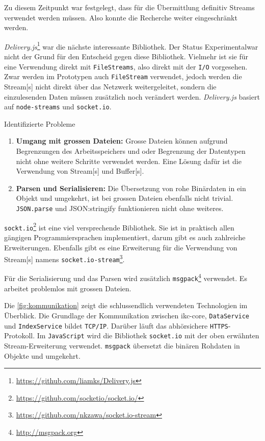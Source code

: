 Zu diesem Zeitpunkt war festgelegt, dass für die Übermittlung definitiv Streams verwendet werden müssen. Also konnte die Recherche weiter eingeschränkt werden.

\textit{Delivery.js}\footnote{\url{https://github.com/liamks/Delivery.js}} war die nächste interessante Bibliothek. Der Status \glqq Experimental\grqq war nicht der Grund für den Entscheid gegen diese Bibliothek. Vielmehr ist sie für eine Verwendung direkt mit \texttt{FileStreams}, also direkt mit der \texttt{I/O} vorgesehen. Zwar werden im Prototypen auch \texttt{FileStream} verwendet, jedoch werden die \gls{Stream}[s] nicht direkt über das Netzwerk weitergeleitet, sondern die einzulesenden Daten müssen zusätzlich noch verändert werden. \textit{Delivery.js} basiert auf \texttt{node-streams} und \texttt{socket.io}.

Identifizierte Probleme
\begin{enumerate}
    \item \textbf{Umgang mit grossen Dateien:} Grosse Dateien können aufgrund Begrenzungen des Arbeitsspeichers und oder Begrenzung der Datentypen nicht ohne weitere Schritte verwendet werden. Eine Lösung dafür ist die Verwendung von \gls{Stream}[s] und \gls{Buffer}[s].
    \item \textbf{Parsen und Serialisieren:} Die Übersetzung von rohe Binärdaten in ein Objekt und umgekehrt, ist bei grossen Dateien ebenfalls nicht trivial. \texttt{JSON.parse} und {JSON:stringify} funktionieren nicht ohne weiteres.
\end{enumerate}

\texttt{sockt.io}\footnote{\url{https://github.com/socketio/socket.io/}} ist eine viel versprechende Bibliothek. Sie ist in praktisch allen gängigen Programmiersprachen implementiert, darum gibt es auch zahlreiche Erweiterungen. Ebenfalls gibt es eine Erweiterung für die Verwendung von \gls{Stream}[s] namens \texttt{socket.io-stream}\footnote{\url{https://github.com/nkzawa/socket.io-stream}}.

Für die Serialisierung und das Parsen wird zusätzlich \texttt{msgpack}\footnote{\url{http://msgpack.org}} verwendet. Es arbeitet problemlos mit grossen Dateien.

Die \autoref{fig:kommunikation} zeigt die schlussendlich verwendeten Technologien im Überblick. Die Grundlage der Kommunikation zwischen \gls{ikc-core}, \texttt{DataService} und \texttt{IndexService} bildet \texttt{TCP/IP}. Darüber läuft das abhörsichere \texttt{HTTPS}-Protokoll. Im \texttt{JavaScript} wird die Bibliothek \texttt{socket.io} mit der oben erwähnten \gls{Stream}-Erweiterung verwendet. \texttt{msgpack} übersetzt die binären Rohdaten in Objekte und umgekehrt.



